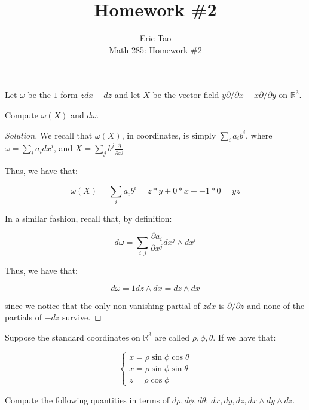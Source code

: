 \documentclass[10pt]{article}
\newenvironment{problem}[2][]{\begin{trivlist}
\item[\hskip \labelsep {\bfseries #1}\hskip \labelsep {\bfseries #2.}]}{\end{trivlist}}
\begin{document}
 
\title{Homework \#2}
\author{Eric Tao\\
Math 285: Homework \#2}
\maketitle

\begin{problem}{Question 1}

Let $\omega$ be the $1$-form $zdx - dz$ and let $X$ be the vector field $y \partial/\partial x + x \partial/\partial y$ on $\mathbb{R}^3$.

Compute $\omega(X)$ and $d\omega$. 

\end{problem}

\begin{proof}[Solution]

We recall that $\omega(X)$, in coordinates, is simply $\sum_{i} a_i b^i$, where $\omega = \sum_i a_i dx^i$, and $X = \sum_j b^j \frac{\partial}{\partial x^j} $

Thus, we have that:

$$\omega(X) = \sum_{i} a_i b^i = z * y + 0 * x + -1 * 0 = yz $$

In a similar fashion, recall that, by definition:

$$ d\omega = \sum_{i,j} \frac{\partial a_i}{\partial x^j} dx^j \wedge dx^i$$

Thus, we have that:

$$ d\omega = 1 dz \wedge dx = dz \wedge dx $$

since we notice that the only non-vanishing partial of $z dx$ is $\partial/\partial z$ and none of the partials of $-dz$ survive. 

\end{proof}

\begin{problem}{Question 2}

Suppose the standard coordinates on $\mathbb{R}^3$ are called $\rho, \phi, \theta$. If we have that:

$$ \begin{cases} x = \rho \sin \phi \cos \theta \\  x = \rho \sin \phi \sin \theta \\ z = \rho \cos \phi \end{cases} $$

Compute the following quantities in terms of $d\rho, d\phi, d\theta$: $dx, dy, dz, dx\wedge dy \wedge dz$.

\end{problem}
\end{document}
